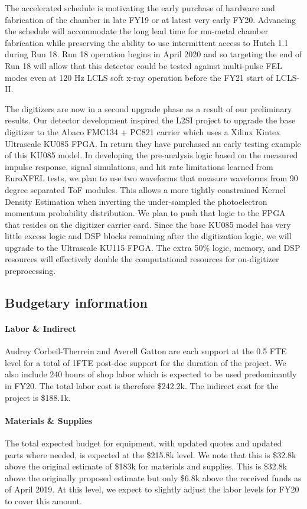 \documentclass[aps]{revtex4}
\begin{document}
The accelerated schedule is motivating the early purchase of hardware and fabrication of the chamber in late FY19 or at latest very early FY20.
Advancing the schedule will accommodate the long lead time for mu-metal chamber fabrication while preserving the ability to use intermittent access to Hutch 1.1 during Run 18.
Run 18 operation begins in April 2020 and so targeting the end of Run 18 will allow that this detector could be tested against multi-pulse FEL modes even at 120 Hz LCLS soft x-ray operation before the FY21 start of LCLS-II.

The digitizers are now in a second upgrade phase as a result of our preliminary results.
Our detector development inspired the L2SI project to upgrade the base digitizer to the Abaco FMC134 + PC821 carrier which uses a Xilinx Kintex Ultrascale KU085 FPGA.  
In return they have purchased an early testing example of this KU085 model.
In developing the pre-analysis logic based on the measured impulse response, signal simulations, and hit rate limitations learned from EuroXFEL tests, we plan to use two waveforms that measure waveforms from 90 degree separated ToF modules.
This allows a more tightly constrained Kernel Density Estimation when inverting the under-sampled the photoelectron momentum probability distribution.
We plan to push that logic to the FPGA that resides on the digitizer carrier card.
Since the base KU085 model has very little excess logic and DSP blocks remaining after the digitization logic, we will upgrade to the Ultrascale KU115 FPGA.
The extra 50\% logic, memory, and DSP resources will effectively double the computational resources for on-digitizer preprocessing.


\subsection*{Budgetary information}
\paragraph*{Labor \& Indirect}
Audrey Corbeil-Therrein and Averell Gatton are each support at the 0.5 FTE level for a total of 1FTE post-doc support for the duration of the project.
We also include 240 hours of shop labor which is expected to be used predominantly in FY20. 
The total labor cost is therefore \$242.2k.
The indirect cost for the project is \$188.1k.

\paragraph*{Materials \& Supplies}
The total expected budget for equipment, with updated quotes and updated parts where needed, is expected at the \$215.8k level.
We note that this is \$32.8k above the original estimate of \$183k for materials and supplies.
This is \$32.8k above the originally proposed estimate but only \$6.8k above the received funds as of April 2019.
At this level, we expect to slightly adjust the labor levels for FY20 to cover this amount.
\end{document}

